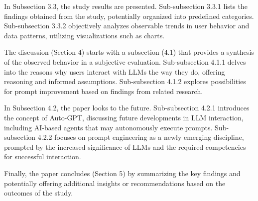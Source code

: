 In Subsection 3.3, the study results are presented. Sub-subsection 3.3.1 lists the findings obtained from the study, potentially organized into predefined categories. Sub-subsection 3.3.2 objectively analyzes observable trends in user behavior and data patterns, utilizing visualizations such as charts.

The discussion (Section 4) starts with a subsection (4.1) that provides a synthesis of the observed behavior in a subjective evaluation. Sub-subsection 4.1.1 delves into the reasons why users interact with LLMs the way they do, offering reasoning and informed assumptions. Sub-subsection 4.1.2 explores possibilities for prompt improvement based on findings from related research.

In Subsection 4.2, the paper looks to the future. Sub-subsection 4.2.1 introduces the concept of Auto-GPT, discussing future developments in LLM interaction, including AI-based agents that may autonomously execute prompts. Sub-subsection 4.2.2 focuses on prompt engineering as a newly emerging discipline, prompted by the increased significance of LLMs and the required competencies for successful interaction.

Finally, the paper concludes (Section 5) by summarizing the key findings and potentially offering additional insights or recommendations based on the outcomes of the study.